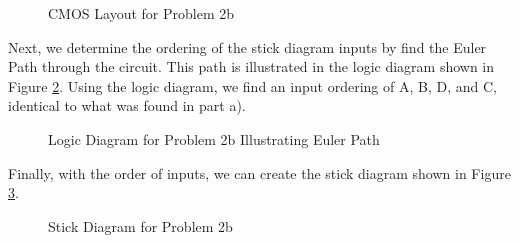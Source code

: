 \documentclass[fleqn]{article}
\begin{document}
\begin{enumerate}
\begin{enumerate}
			\begin{figure}[H]
				\centerline{}
				\caption{CMOS Layout for Problem 2b}
				\label{fig::cmos_layout_problem_2b}
			\end{figure}
			
			Next, we determine the ordering of the stick diagram inputs by find the Euler Path through the circuit. This path is illustrated in the logic diagram shown in Figure \ref{fig::logic_diagram_problem_2b}. Using the logic diagram, we find an input ordering of A, B, D, and C, identical to what was found in part a).
			
			\begin{figure}[H]
				\centerline{}
				\caption{Logic Diagram for Problem 2b Illustrating Euler Path}
				\label{fig::logic_diagram_problem_2b}
			\end{figure}
			
			Finally, with the order of inputs, we can create the stick diagram shown in Figure \ref{fig::stick_diagram_problem_2b}.
			
			\begin{figure}[H]
				\centerline{}
				\caption{Stick Diagram for Problem 2b}
				\label{fig::stick_diagram_problem_2b}
			\end{figure}
		\end{enumerate}
		

\end{enumerate}
\end{document}
